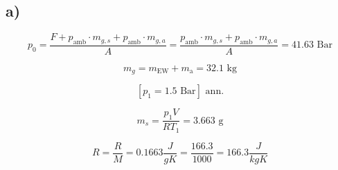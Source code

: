 

\subsection*{a)}
\[
p_0 = \frac{F + p_{\text{amb}} \cdot m_{g,s} + p_{\text{amb}} \cdot m_{g,a}}{A} = \frac{p_{\text{amb}} \cdot m_{g,s} + p_{\text{amb}} \cdot m_{g,a}}{A} = 41.63 \text{ Bar}
\]

\[
m_g = m_{\text{EW}} + m_{\text{a}} = 32.1 \text{ kg}
\]

\[
[p_1 = 1.5 \text{ Bar}] \text{ ann.}
\]

\[
m_s = \frac{p_1 V}{R T_1} = 3.663 \text{ g}
\]

\[
R = \frac{R}{M} = 0.1663 \frac{J}{gK} = \frac{166.3}{1000} = 166.3 \frac{J}{kgK}
\]